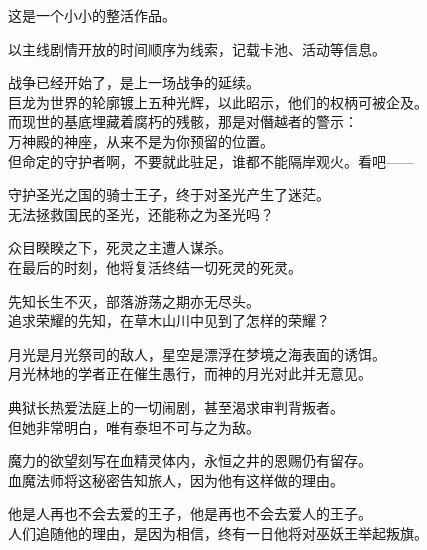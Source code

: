 \documentclass[a4paper,10pt]{article}
\begin{document}

\fulldoctitle

这是一个小小的整活作品。

以主线剧情开放的时间顺序为线索，记载卡池、活动等信息。

{\Nmaketoc}\clearpage



战争已经开始了，是上一场战争的延续。\\
巨龙为世界的轮廓镀上五种光辉，以此昭示，他们的权柄可被企及。\\
而现世的基底埋藏着腐朽的残骸，那是对僭越者的警示：\\
万神殿的神座，从来不是为你预留的位置。\\
但命定的守护者啊，不要就此驻足，谁都不能隔岸观火。看吧——

守护圣光之国的骑士王子，终于对圣光产生了迷茫。\\
无法拯救国民的圣光，还能称之为圣光吗？

众目睽睽之下，死灵之主遭人谋杀。\\
在最后的时刻，他将复活终结一切死灵的死灵。

先知长生不灭，部落游荡之期亦无尽头。\\
追求荣耀的先知，在草木山川中见到了怎样的荣耀？

月光是月光祭司的敌人，星空是漂浮在梦境之海表面的诱饵。\\
月光林地的学者正在催生愚行，而神的月光对此并无意见。

典狱长热爱法庭上的一切闹剧，甚至渴求审判背叛者。\\
但她非常明白，唯有泰坦不可与之为敌。

魔力的欲望刻写在血精灵体内，永恒之井的恩赐仍有留存。\\
血魔法师将这秘密告知旅人，因为他有这样做的理由。

他是人再也不会去爱的王子，他是再也不会去爱人的王子。\\
人们追随他的理由，是因为相信，终有一日他将对巫妖王举起叛旗。



\end{document}
